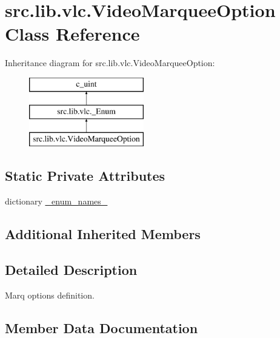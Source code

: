 \hypertarget{classsrc_1_1lib_1_1vlc_1_1VideoMarqueeOption}{}\section{src.\+lib.\+vlc.\+Video\+Marquee\+Option Class Reference}
\label{classsrc_1_1lib_1_1vlc_1_1VideoMarqueeOption}
Inheritance diagram for src.\+lib.\+vlc.\+Video\+Marquee\+Option\+:\begin{figure}[H]
\begin{center}
\leavevmode
\includegraphics[height=3.000000cm]{classsrc_1_1lib_1_1vlc_1_1VideoMarqueeOption}
\end{center}
\end{figure}
\subsection*{Static Private Attributes}
\begin{DoxyCompactItemize}
\item 
dictionary \hyperlink{classsrc_1_1lib_1_1vlc_1_1VideoMarqueeOption_a211a7ad22269a5ebbdd3a7883077ff3e}{\+\_\+enum\+\_\+names\+\_\+}
\end{DoxyCompactItemize}
\subsection*{Additional Inherited Members}


\subsection{Detailed Description}
\begin{DoxyVerb}Marq options definition.
\end{DoxyVerb}
 

\subsection{Member Data Documentation}
\hypertarget{classsrc_1_1lib_1_1vlc_1_1VideoMarqueeOption_a211a7ad22269a5ebbdd3a7883077ff3e}{}
